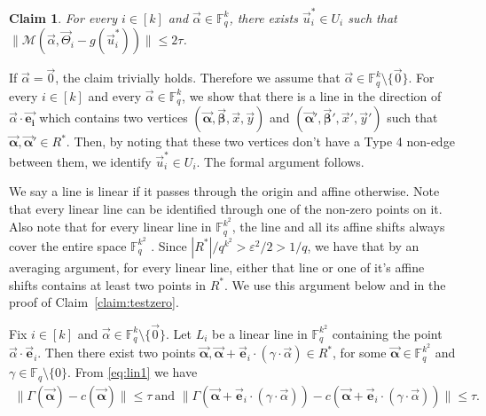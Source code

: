 \documentclass[11pt]{article}
\newcommand{\F}{\mathbb{F}}
\renewcommand{\le}{ \leqslant}
\newtheorem{claim}[theorem]{Claim}
\newcommand{\alphab}{\vec{\bm{\alpha}}}
\newcommand{\betab}{\vec{\bm{\beta}}}
\renewcommand{\kappa}{\tau}
\newcommand{\M}{\mathcal{M}}
\begin{document}
\begin{claim}\label{claim:decodespecificalpha}
For every $i\in[k]$ and $\vec{\alpha}\in\F_q^k$, there exists $\vec{u}_i^\ast\in U_i$  such that $\|\M(  \vec{\alpha},\vec{\Theta}_i-g(\vec{u}_i^\ast)) \|\le 2\kappa$.
\end{claim}


If $\vec{\alpha}=\vec{0}$, the claim trivially holds. Therefore we assume that $\vec{\alpha}\in\F_q^k\setminus \{\vec{0}\}$. For every $i\in[k]$ and every $\vec{\alpha}\in \F_q^k$, we show that there is a line in the direction of $\vec{\alpha}\cdot \vec{\bm{e_i}}$ which contains two vertices $(\alphab,\betab,\vec{x},\vec{y})$ and  $(\alphab',\betab',\vec{x}',\vec{y}')$ such that  $\alphab,\alphab'\in R^\ast$. Then, by noting that these two vertices don't have a Type 4 non-edge between them, we identify $\vec{u}_i^\ast\in U_i$. The formal argument follows.

We say a line is linear if it passes through the origin and affine otherwise. Note that every linear line can be identified through one of the non-zero points on it. Also note that for every linear line in $\F_q^{k^2}$, the line   and all its affine shifts always cover the entire space $\F_q^{k^2}$ . 
 Since $|{R}^\ast|/q^{k^2}>\varepsilon^2/2>1/q$, we have that  by an averaging argument,  for every linear line, either that line or one of it's affine shifts   contains at least two points in $R^\ast$. We use this argument below and in the proof of Claim~\ref{claim:testzero}.


Fix $i\in[k]$ and $\vec{\alpha}\in\F_q^k\setminus \{\vec{0}\}$. Let $L_i$ be a linear line in $\F_q^{k^2}$  containing the point  $\vec{\alpha}\cdot \vec{\bm e}_i$. Then there exist two points  $\vec{\bm{\alpha}},\vec{\bm{\alpha}}+\vec{\bm e}_i\cdot (\gamma\cdot\vec{\alpha})\in  {R}^\ast$, for some $\alphab\in\F_q^{k^2}$ and $\gamma\in \F_q\setminus\{0\}$. From \eqref{eq:lin1} we have
\begin{align}
\|\Gamma(\vec{\bm{\alpha}})-c(\vec{\bm{\alpha}})\|\le \kappa\ \text{and } \|\Gamma(\vec{\bm{\alpha}}+\vec{\bm e}_i\cdot (\gamma\cdot\vec{\alpha}))-c(\vec{\bm{\alpha}}+\vec{\bm e}_i\cdot (\gamma\cdot\vec{\alpha}))\|\le \kappa. 
\label{eq:lin2}
\end{align}
\end{document}
